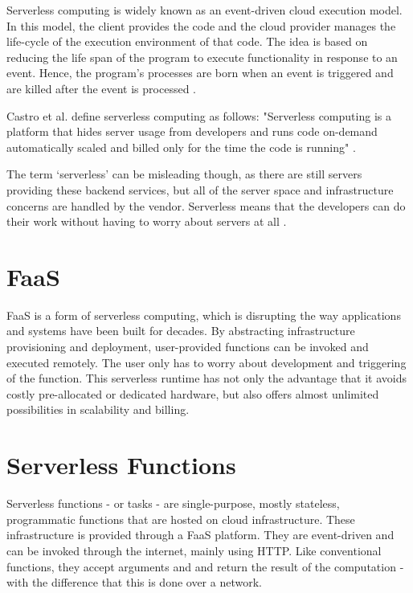\documentclass[a4paper,12pt,pdftex,halfparskip,cleardoubleempty,bibtotoc,liststotoc]{scrbook}
\begin{document}
Serverless computing is widely known as an event-driven cloud execution model. In this model, the client provides the code  and the cloud provider manages the life-cycle of the execution environment of that code.
The idea is based on reducing the life span of the program to execute functionality in response to an event. Hence, the program's processes are born when an event is triggered and are killed after the event is processed \cite{inproceedings-serverless-beyond-the-cloud-kanso}.

Castro et al. define serverless computing as follows: "Serverless computing is a platform that hides server usage from developers and runs code on-demand automatically scaled and billed only for the time the code is running" \cite{articles-rise-of-serverless-castro}.

The term ‘serverless’ can be misleading though, as there are still servers providing these backend services, but all of the server space and infrastructure concerns are handled by the vendor. Serverless means that the developers can do their work without having to worry about servers at all \cite{online-what-is-serverless-cloudflare}.

\section{FaaS}

FaaS is a form of serverless computing, which is disrupting the way applications and systems have been built for decades. By abstracting infrastructure provisioning and deployment, user-provided functions can be invoked and executed remotely. The user only has to worry about development and triggering of the function. This serverless runtime has not only the advantage that it avoids costly pre-allocated or dedicated hardware, but also offers almost unlimited possibilities in scalability and billing.

\section{Serverless Functions}
Serverless functions - or tasks - are single-purpose, mostly stateless, programmatic functions that are hosted on cloud infrastructure. These infrastructure is provided through a FaaS platform. They are event-driven and can be invoked through the internet, mainly using HTTP. Like conventional functions, they accept arguments and and return the result of the computation  - with the difference that this is done over a network.
\end{document}
